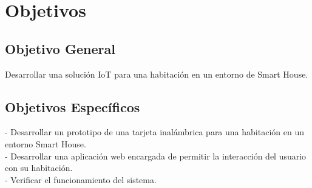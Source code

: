 \chapter{Objetivos}

\section{Objetivo General}

Desarrollar una solución IoT para una habitación en un entorno de Smart House.\\


\section{Objetivos Específicos}


- Desarrollar un prototipo de una tarjeta inalámbrica para una habitación en un entorno Smart House.\\

- Desarrollar una aplicación web encargada de permitir la interacción del usuario con su habitación.\\

- Verificar el funcionamiento del sistema.\\